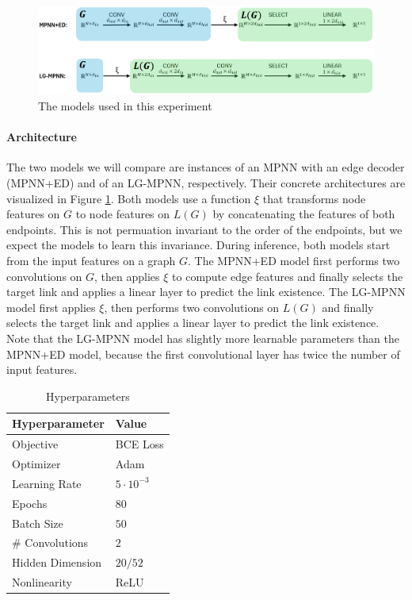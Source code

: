 \documentclass{article}
\begin{document}
\begin{figure}[ht]
    \centering
    \includegraphics[width=\textwidth]{figures/architectures.PNG}
    \caption{The models used in this experiment}
    \label{fig:architectures}
\end{figure}


\paragraph{Architecture} The two models we will compare are instances of an MPNN with an edge decoder (MPNN+ED) and of an LG-MPNN, respectively. Their concrete architectures are visualized in Figure \ref{fig:architectures}.
Both models use a function $\xi$ that transforms node features on $G$ to node features on $L(G)$ by concatenating the features of both endpoints. This is not permuation invariant to the order of the endpoints, but we expect the models to learn this invariance.
During inference, both models start from the input features on a graph $G$.
The MPNN+ED model first performs two convolutions on $G$, then applies $\xi$ to compute edge features and finally selects the target link and applies a linear layer to predict the link existence.
The LG-MPNN model first applies $\xi$, then performs two convolutions on $L(G)$ and finally selects the target link and applies a linear layer to predict the link existence.
Note that the LG-MPNN model has slightly more learnable parameters than the MPNN+ED model, because the first convolutional layer has twice the number of input features.


\begin{table}
    \centering
    \small
    \caption{Hyperparameters}   \label{table:hyperparameters}
    \begin{tabular}{l l}
        \toprule
        \textbf{Hyperparameter} & \textbf{Value} \\
        \midrule
        Objective & BCE Loss \\
        Optimizer & Adam \\
        Learning Rate & $5\cdot10^{-3}$ \\
        Epochs & $80$ \\
        Batch Size & $50$ \\
        \# Convolutions & $2$ \\
        Hidden Dimension & $20/52$ \\
        Nonlinearity & ReLU \\
        \bottomrule
    \end{tabular}
\end{table}
\end{document}
